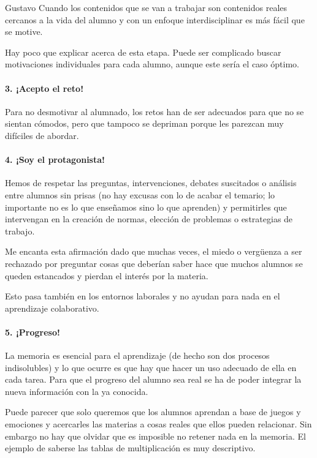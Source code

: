 \begin{opin}{\guscolor}{Gustavo}
Cuando los contenidos que se van a trabajar son contenidos reales cercanos a la vida del alumno y con un enfoque interdisciplinar es más fácil que se motive.

Hay poco que explicar acerca de esta etapa. Puede ser complicado buscar motivaciones individuales para cada alumno, aunque este sería el caso óptimo.

\paragraph{3. ¡Acepto el reto!}

Para no desmotivar al alumnado, los retos han de ser adecuados para que no se sientan cómodos, pero que tampoco se depriman porque les parezcan muy difíciles de abordar.

\paragraph{4. ¡Soy el protagonista!}

Hemos de respetar las preguntas, intervenciones, debates suscitados o análisis entre alumnos sin prisas (no hay excusas con lo de acabar el temario; lo importante no es lo que enseñamos sino lo que aprenden) y permitirles que intervengan en la creación de normas, elección de problemas o estrategias de trabajo.

Me encanta esta afirmación dado que muchas veces, el miedo o vergüenza a ser rechazado por preguntar cosas que deberían saber hace que muchos alumnos se queden estancados y pierdan el interés por la materia.

Esto pasa también en los entornos laborales y no ayudan para nada en el aprendizaje colaborativo.

\paragraph{5. ¡Progreso!}

La memoria es esencial para el aprendizaje (de hecho son dos procesos indisolubles) y lo que ocurre es que hay que hacer un uso adecuado de ella en cada tarea. Para que el progreso del alumno sea real se ha de poder integrar la nueva información con la ya conocida.

Puede parecer que solo queremos que los alumnos aprendan a base de juegos y emociones y acercarles las materias a cosas reales que ellos pueden relacionar. Sin embargo no hay que olvidar que es imposible no retener nada en la memoria. El ejemplo de saberse las tablas de multiplicación es muy descriptivo.


\end{opin}

